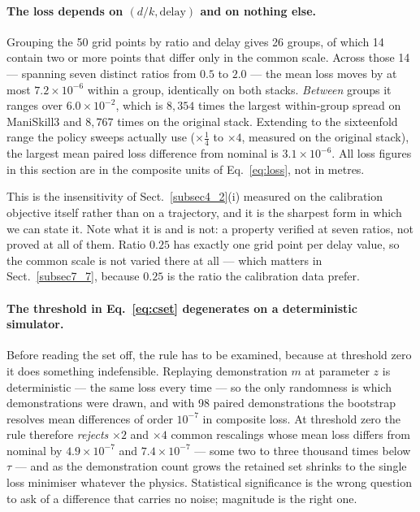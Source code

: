 \documentclass[pdflatex,iicol,sn-apa]{sn-jnl}
\theoremstyle{remark}
\begin{document}
\paragraph{The loss depends on $(d/k, \text{delay})$ and on nothing else.}
Grouping the 50 grid points by ratio and delay gives 26 groups, of which 14 contain two or more
points that differ only in the common scale. Across those 14 --- spanning seven distinct ratios from
$0.5$ to $2.0$ --- the mean loss moves by at most $7.2\times10^{-6}$ within a group, identically on
both stacks. \emph{Between} groups it ranges over $6.0\times10^{-2}$, which is $8{,}354$ times the
largest within-group spread on ManiSkill3 and $8{,}767$ times on the original stack. Extending to
the sixteenfold range the policy sweeps actually use ($\times\tfrac14$ to $\times 4$, measured on
the original stack), the largest mean paired loss difference from nominal is $3.1\times10^{-6}$.
All loss figures in this section are in the composite units of Eq.~\eqref{eq:loss}, not in metres.

This is the insensitivity of Sect.~\ref{subsec4_2}(i) measured on the calibration objective itself
rather than on a trajectory, and it is the sharpest form in which we can state it. Note what it is
and is not: a property verified at seven ratios, not proved at all of them. Ratio $0.25$ has exactly
one grid point per delay value, so the common scale is not varied there at all --- which matters in
Sect.~\ref{subsec7_7}, because $0.25$ is the ratio the calibration data prefer.

\paragraph{The threshold in Eq.~\eqref{eq:cset} degenerates on a deterministic simulator.}
Before reading the set off, the rule has to be examined, because at threshold zero it does something
indefensible. Replaying demonstration $m$ at parameter $z$ is deterministic --- the same loss every
time --- so the only randomness is which demonstrations were drawn, and with 98 paired
demonstrations the bootstrap resolves mean differences of order $10^{-7}$ in composite loss. At
threshold zero the rule therefore \emph{rejects} $\times 2$ and $\times 4$ common rescalings whose
mean loss differs from nominal by $4.9\times10^{-7}$ and $7.4\times10^{-7}$ --- some two to three
thousand times below $\tau$ --- and as the demonstration count grows the retained
set shrinks to the single loss minimiser whatever the physics. Statistical significance is the wrong
question to ask of a difference that carries no noise; magnitude is the right one.
\end{document}
